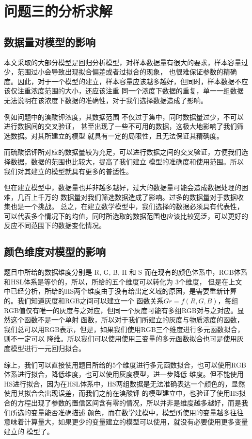\section{问题三的分析求解}
\subsection{数据量对模型的影响}
   本文采取的大部分模型是回归分析模型，对样本数据量有很大的要求，样本容量过少，范围过小会导致出现拟合偏差或者过拟合的现象，
   也很难保证参数的精确度。因此，对于一个模型的建立，样本容量应该越多越好，但同时，样本数据不应该仅注重浓度范围的大小，还应该注重
   同一个浓度下数据的重复，单一一组数据无法说明在该浓度下数据的准确性，对于我们选择数据造成了影响。
   
   例如问题中的溴酸钾浓度，其数据范围 不仅过于集中，同时数据量过少，不可以进行数据间的交叉验证，
   甚至出现了一些不可用的数据，这极大地影响了我们筛选数据。对其所建立的模型 就具有一定的局限性，且无法保证其精确度。

   而硫酸铝钾所对应的数据量较为充足，可以进行数据之间的交叉验证，方便我们选择数据，数据的范围也比较大，提高了我们建立
   模型的准确度和使用范围。所以我们对其建立的模型就具有更多的普适性。
   
   但在建立模型中，数据量也并非越多越好，过大的数据量可能会造成数据处理的困难，几百上千万的
   数据量对我们筛选数据造成了影响。过多的数据量对于数据收集也是一个挑战。
   总之，在建立数学模型中，我们选择的数据必须具有代表性，可以代表多个情况下的均值，同时所选取的数据范围也应该比较宽泛，可以更好的
   反应不同范围下的数据变化情况。

\subsection{颜色维度对模型的影响}
    题目中所给的数据维度分别是 R, G, B, H 和 S 而在现有的颜色体系中，RGB体系和HSL体系是等价的，所以，所给的五个维度可以转化为
    3个维度， 但是在上文中已经分析，所给的HS两个维度由于没有给出定义域的原因，是需要重新计算的。我们知道灰度和RGB之间可以建立一个
    函数关系$Gr = f(R, G, B)$，每组RGB值仅有唯一的灰度与之对应，但同一个灰度可能有多组RGB对与之对应。显然这个函数不是一个单射
    函数，所以对于我们所建立的灰度与物质浓度的函数，我们总可以用RGB表示，但是，如果我们使用RGB三个维度进行多元函数拟合，则不一定可以
    降维。所以我们可以使用使用三变量的多元函数拟合也可是使用灰度模型进行一元回归拟合。
    
    综上，我们可以直接使用题目所给的5个维度进行多元函数拟合，也可以使用RGB体系进行拟合，降低维度，也可以使用灰度模型，进一步降低
    维度。但不能使用HS进行拟合，因为在HSL体系中，HS两组数据是无法准确表达一个颜色的，显然使用其拟合会出现误差，而我们之前在溴酸钾
    的模型建立中，也验证了使用HS拟合的方程出现了参数的置信区间含有零的情况，所以并非是维度越多越好，而是我们所选的变量能否准确描述
    颜色，而在数学建模中，模型所使用的变量越多往往意味着计算量大，如果更少的变量建立的模型可以使用，就没有必要使用更多变量建立的
    模型了。
